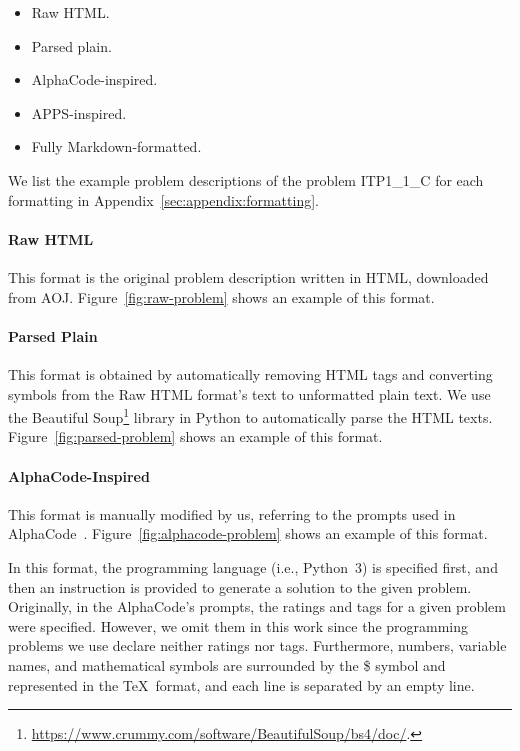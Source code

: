 \documentclass{article}
\begin{document}
\begin{itemize}
    \item Raw HTML.
    \item Parsed plain.
    \item AlphaCode-inspired.
    \item APPS-inspired.
    \item Fully Markdown-formatted.
\end{itemize}

We list the example problem descriptions of the problem ITP1\_1\_C for each formatting in Appendix~\ref{sec:appendix:formatting}.





\paragraph{Raw HTML}

This format is the original problem description written in HTML, downloaded from AOJ.
Figure~\ref{fig:raw-problem} shows an example of this format.



\paragraph{Parsed Plain}

This format is obtained by automatically removing HTML tags and converting symbols from the Raw HTML format's text to unformatted plain text.
We use the Beautiful Soup\footnote{\url{https://www.crummy.com/software/BeautifulSoup/bs4/doc/}.} library in Python to automatically parse the HTML texts.
Figure~\ref{fig:parsed-problem} shows an example of this format.



\paragraph{AlphaCode-Inspired}

This format is manually modified by us, referring to the prompts used in AlphaCode~\citep{li2022alphacode}.
Figure~\ref{fig:alphacode-problem} shows an example of this format.

In this format, the programming language (i.e., Python~3) is specified first, and then an instruction is provided to generate a solution to the given problem.
Originally, in the AlphaCode's prompts, the ratings and tags for a given problem were specified.
However, we omit them in this work since the programming problems we use declare neither ratings nor tags.
Furthermore, numbers, variable names, and mathematical symbols are surrounded by the \$ symbol and represented in the \TeX\, format, and each line is separated by an empty line.
\end{document}
